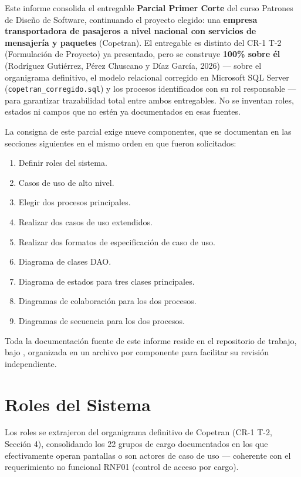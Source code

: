 \documentclass[11pt,a4paper]{article}
\begin{document}
Este informe consolida el entregable \textbf{Parcial Primer Corte} del curso Patrones de Diseño
de Software, continuando el proyecto elegido: una \textbf{empresa transportadora de pasajeros a
nivel nacional con servicios de mensajería y paquetes} (Copetran). El entregable es distinto del
CR-1 T-2 (Formulación de Proyecto) ya presentado, pero se construye \textbf{100\% sobre él}
(Rodríguez Gutiérrez, Pérez Chuscano y Díaz García, 2026) ---
sobre el organigrama definitivo, el modelo relacional corregido en Microsoft SQL Server
(\texttt{copetran_corregido.sql}) y los procesos identificados con su rol responsable --- para
garantizar trazabilidad total entre ambos entregables. No se inventan roles, estados ni campos que
no estén ya documentados en esas fuentes.

La consigna de este parcial exige nueve componentes, que se documentan en las secciones
siguientes en el mismo orden en que fueron solicitados:

\begin{enumerate}[nosep]
  \item Definir roles del sistema.
  \item Casos de uso de alto nivel.
  \item Elegir dos procesos principales.
  \item Realizar dos casos de uso extendidos.
  \item Realizar dos formatos de especificación de caso de uso.
  \item Diagrama de clases DAO.
  \item Diagrama de estados para tres clases principales.
  \item Diagramas de colaboración para los dos procesos.
  \item Diagramas de secuencia para los dos procesos.
\end{enumerate}

Toda la documentación fuente de este informe reside en el repositorio de trabajo, bajo
, organizada en un archivo por componente para facilitar su
revisión independiente.

\section{Roles del Sistema}

Los roles se extrajeron del organigrama definitivo de Copetran (CR-1 T-2, Sección 4), consolidando
los 22 grupos de cargo documentados en los que efectivamente operan pantallas o son actores de
caso de uso --- coherente con el requerimiento no funcional RNF01 (control de acceso por cargo).
\end{document}

